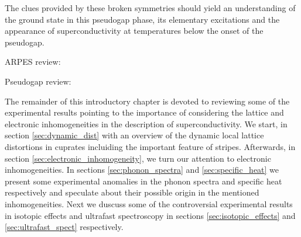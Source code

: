 
The clues provided by these broken symmetries should yield an understanding of the ground state in this pseudogap phase, its elementary excitations and the appearance of superconductivity at temperatures below the onset of the pseudogap. 



ARPES review: \cite{Damascelli2003}

Pseudogap review: \cite{Timusk1999}

The remainder of this introductory chapter is devoted to reviewing some of the experimental results pointing to the importance of considering the lattice and electronic inhomogeneities in the description of superconductivity. 
We start, in section \ref{sec:dynamic_dist} with an overview of the dynamic local lattice distortions in cuprates incluiding the important feature of stripes. 
Afterwards, in section \ref{sec:electronic_inhomogeneity}, we turn our attention to electronic inhomogeneities. 
In sections \ref{sec:phonon_spectra} and \ref{sec:specific_heat} we present some experimental anomalies in the phonon spectra and specific heat respectively and speculate about their possible origin in the mentioned inhomogeneities. 
Next we duscuss some of the controversial experimental results in isotopic effects and ultrafast spectroscopy in sections \ref{sec:isotopic_effects} and \ref{sec:ultrafast_spect} respectively.

